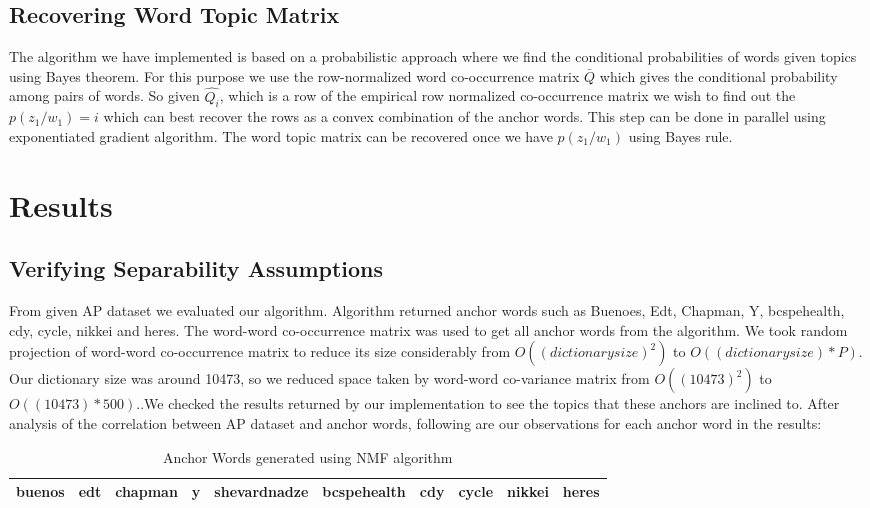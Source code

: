 \documentclass[a4paper,11pt]{article}
\begin{document}
\subsection{Recovering Word Topic Matrix}
The algorithm we have implemented is based on a probabilistic approach where we find the conditional probabilities of words given topics using Bayes theorem. For this purpose we use the row-normalized word co-occurrence matrix $\bar{Q}$ which gives the conditional probability among pairs of words. So given $\hat{Q_{i}}$, which is a row of the empirical row normalized co-occurrence matrix we wish to find out the $p(z_{1}/w_{1})=i$ which can best recover the rows as a convex combination of the anchor words. This step can be done in parallel using exponentiated gradient algorithm. The word topic matrix can be recovered once we have $p(z_{1}/w_{1})$ using Bayes rule. 


\section{Results}

\subsection{Verifying Separability Assumptions}

From given AP dataset we evaluated our algorithm. Algorithm returned anchor words such as Buenoes, Edt, Chapman, Y, bcspehealth, cdy, cycle, nikkei and heres. The word-word co-occurrence matrix was used to get all anchor words from the algorithm. We took random projection of word-word co-occurrence matrix to reduce its size considerably from $O((dictionary size)^2)$ to $O((dictionary size)*P)$. Our dictionary size was around 10473, so we reduced space taken by word-word co-variance matrix from $O((10473)^2)$ to $O((10473)*500)$..We checked the results returned by our implementation to see the topics that these anchors are inclined to. After analysis of the correlation between AP dataset and anchor words, following are our observations for each anchor word in the results:

\begin{table}
    \begin{tabular}{|l|l|l|l|l|l|l|l|l|l|}
    \hline
    buenos & edt & chapman & y & shevardnadze & bcspehealth & cdy & cycle & nikkei & heres \\ \hline
    \end{tabular}
    \caption {Anchor Words generated using NMF algorithm}
\end{table}
\end{document}
